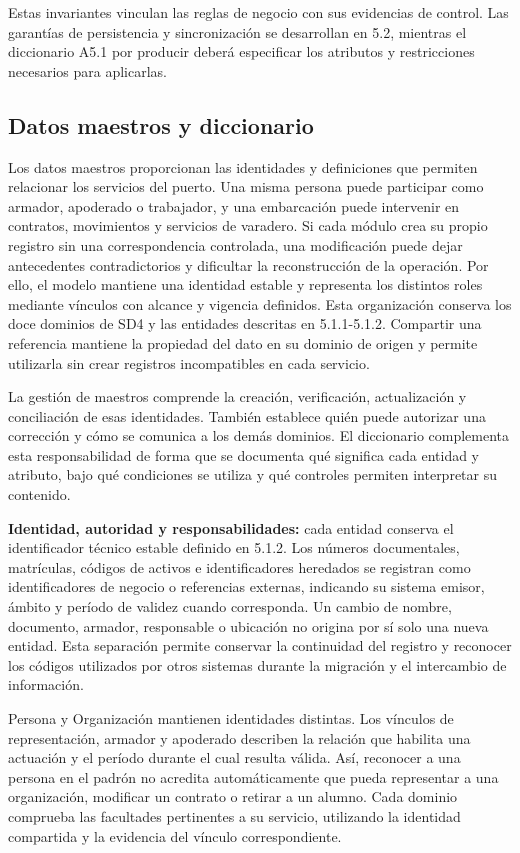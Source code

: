 Estas invariantes vinculan las reglas de negocio con sus evidencias de control. Las garantías de persistencia y sincronización se desarrollan en 5.2, mientras el diccionario A5.1 por producir deberá especificar los atributos y restricciones necesarios para aplicarlas.

\subsection{Datos maestros y diccionario}
Los datos maestros proporcionan las identidades y definiciones que permiten relacionar los servicios del puerto. Una misma persona puede participar como armador, apoderado o trabajador, y una embarcación puede intervenir en contratos, movimientos y servicios de varadero. Si cada módulo crea su propio registro sin una correspondencia controlada, una modificación puede dejar antecedentes contradictorios y dificultar la reconstrucción de la operación. Por ello, el modelo mantiene una identidad estable y representa los distintos roles mediante vínculos con alcance y vigencia definidos. Esta organización conserva los doce dominios de SD4 y las entidades descritas en 5.1.1-5.1.2. Compartir una referencia mantiene la propiedad del dato en su dominio de origen y permite utilizarla sin crear registros incompatibles en cada servicio.

La gestión de maestros comprende la creación, verificación, actualización y conciliación de esas identidades. También establece quién puede autorizar una corrección y cómo se comunica a los demás dominios. El diccionario complementa esta responsabilidad de forma que se documenta qué significa cada entidad y atributo, bajo qué condiciones se utiliza y qué controles permiten interpretar su contenido.

\textbf{Identidad, autoridad y responsabilidades:} cada entidad conserva el identificador técnico estable definido en 5.1.2. Los números documentales, matrículas, códigos de activos e identificadores heredados se registran como identificadores de negocio o referencias externas, indicando su sistema emisor, ámbito y período de validez cuando corresponda. Un cambio de nombre, documento, armador, responsable o ubicación no origina por sí solo una nueva entidad. Esta separación permite conservar la continuidad del registro y reconocer los códigos utilizados por otros sistemas durante la migración y el intercambio de información.

Persona y Organización mantienen identidades distintas. Los vínculos de representación, armador y apoderado describen la relación que habilita una actuación y el período durante el cual resulta válida. Así, reconocer a una persona en el padrón no acredita automáticamente que pueda representar a una organización, modificar un contrato o retirar a un alumno. Cada dominio comprueba las facultades pertinentes a su servicio, utilizando la identidad compartida y la evidencia del vínculo correspondiente.

